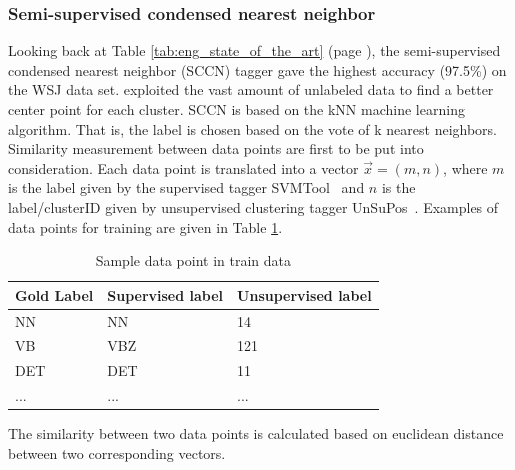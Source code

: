 \subsubsection{Semi-supervised condensed nearest neighbor}
Looking back at Table \ref{tab:eng_state_of_the_art} (page \pageref{tab:eng_state_of_the_art}), the semi-supervised condensed nearest neighbor (SCCN) tagger \cite{semiSuPOSCondense} gave the highest accuracy (97.5\%) on the WSJ data set.  exploited the vast amount of unlabeled data to find a better center point for each cluster. SCCN is based on the kNN machine learning algorithm. That is, the label is chosen based on the vote of k nearest neighbors. Similarity measurement between data points are first to be put into consideration. Each data point is translated into a vector $ \overrightarrow{x} = (m,n)$, where $m$ is the label given by the supervised tagger SVMTool~\cite{svmtool} and $n$ is the label/clusterID given by unsupervised clustering tagger UnSuPos~\cite{unSupPOSClustering}. Examples of data points for training are given in Table \ref{tab:sampleDataPoin}. 
\begin{table}
  \centering
    \begin{tabular}{p{4cm}|p{4cm}p{4cm}}
     Gold Label & Supervised label & Unsupervised label \\\hline
     NN & NN & 14 \\\hline
     VB & VBZ & 121 \\\hline        
     DET & DET & 11 \\             
     ... & ... & ...\\             
    \end{tabular}

  \caption{Sample data point in train data}  
  \label{tab:sampleDataPoin}
\end{table}
The similarity between two data points is calculated based on euclidean distance between two corresponding vectors. 

